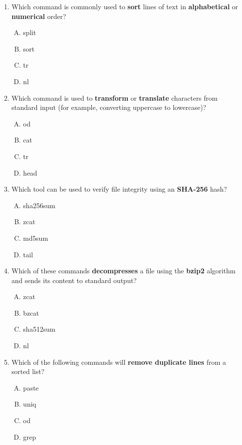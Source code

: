 \documentclass[a4paper]{report}
\begin{document}
\begin{enumerate}[1.]
    \item Which command is commonly used to \textbf{sort} lines of text in \textbf{alphabetical} or \textbf{numerical} order?  
    \begin{enumerate}[A)]
        \item split  
        \item sort  
        \item tr  
        \item nl  
    \end{enumerate}

    \item Which command is used to \textbf{transform} or \textbf{translate} characters from standard input (for example, converting uppercase to lowercase)?  
    \begin{enumerate}[A)]
        \item od  
        \item cat  
        \item tr  
        \item head  
    \end{enumerate}

    \item Which tool can be used to verify file integrity using an \textbf{SHA-256} hash?  
    \begin{enumerate}[A)]
        \item sha256sum  
        \item zcat  
        \item md5sum  
        \item tail  
    \end{enumerate}

    \item Which of these commands \textbf{decompresses} a file using the \textbf{bzip2} algorithm and sends its content to standard output?  
    \begin{enumerate}[A)]
        \item zcat  
        \item bzcat  
        \item sha512sum  
        \item nl  
    \end{enumerate}

    \item Which of the following commands will \textbf{remove duplicate lines} from a sorted list?  
    \begin{enumerate}[A)]
        \item paste  
        \item uniq  
        \item od  
        \item grep  
    \end{enumerate}


\end{enumerate}
\end{document}
